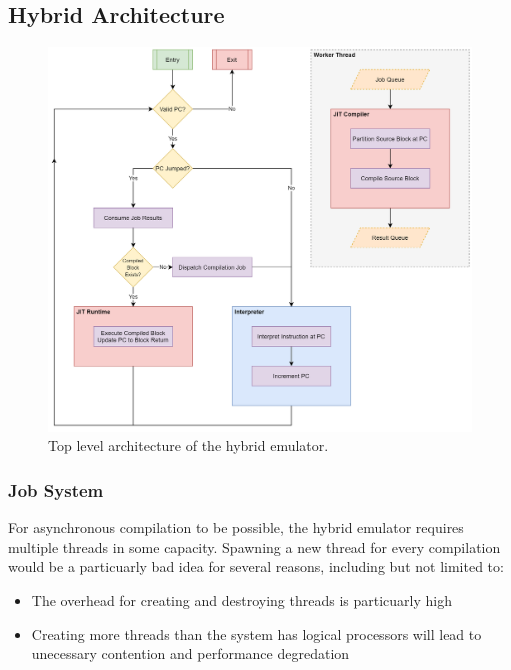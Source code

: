 \subsection{Hybrid Architecture}
\label{section:hybrid-arch}


\begin{figure}[h]
    \centering
    \includegraphics[width=1\linewidth]{diagrams/hybrid.png}
    \caption{Top level architecture of the hybrid emulator.}
    \label{figure:hybrid-arch}
\end{figure}

\subsubsection{Job System}

For asynchronous compilation to be possible, the hybrid emulator requires multiple threads in some capacity. Spawning a new thread for every compilation would be a particuarly bad idea for several reasons, including but not limited to:

\begin{itemize}
    \item The overhead for creating and destroying threads is particuarly high
    \item Creating more threads than the system has logical processors will lead to unecessary contention and performance degredation
\end{itemize}


